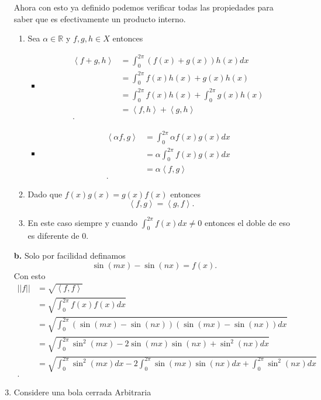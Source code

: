 \documentclass{report}
\begin{document}
\begin{enumerate}
    Ahora con esto ya definido podemos verificar todas las propiedades para saber que es efectivamente un producto interno.
    \begin{enumerate}
      \item Sea $\alpha \in \mathbb{R}$ y $f, g, h \in X$ entonces
	\begin{itemize}
	  \item 
	    \begin{align*}
	      \left<f + g, h \right> &= \int_0^{2\pi} \left( f\left( x \right) + g\left( x \right)  \right) h\left( x \right) dx \\
	      &= \int_0^{2\pi} f\left( x \right) h\left( x \right) + g\left( x \right) h\left( x \right)   \\
	      &= \int_0^{2\pi} f\left( x \right) h\left( x \right) + \int_0^{2\pi} g\left( x \right) h\left( x \right)  \\
	      &= \left<f, h \right> + \left<g, h \right> \\
	    .\end{align*}
	  \item 
	    \begin{align*}
	      \left<\alpha f, g \right> &= \int_0^{2\pi} \alpha f\left( x \right) g\left( x \right) dx\\
	      &= \alpha \int_0^{2\pi} f\left( x \right) g\left( x \right) dx \\
	      &= \alpha \left<f, g \right> \\
	    .\end{align*}
	\end{itemize}
      \item Dado que $f\left( x \right) g\left( x \right)  = g\left( x \right) f\left( x \right) $ entonces \[
	  \left<f, g \right> = \left<g, f \right>
      .\] 
    \item En este caso siempre y cuando $\int_0^{2\pi} f\left( x \right) dx \neq 0$ entonces el doble de eso es diferente de 0.
    \end{enumerate}
  \item[\textbf{b.}] Solo por facilidad definamos \[
      \sin\left( mx \right) - \sin\left( nx \right) = f\left( x \right)
  .\] Con esto
    \begin{align*}
      \left| \left| f \right|  \right| &= \sqrt{\left< f, f\right>}  \\
      &= \sqrt{\int_0^{2\pi} f\left( x \right) f\left( x \right) dx}  \\
      &= \sqrt{\int_0^{2\pi} \left( \sin\left( mx \right) - \sin\left( nx \right) \right) \left( \sin\left( mx \right) - \sin\left( nx \right)  \right) dx}  \\
      &= \sqrt{\int_0^{2\pi} \sin^2\left( mx \right) - 2\sin\left( mx \right) \sin\left( nx \right) + \sin^2\left( nx \right) dx}  \\
      &= \sqrt{\int_0^{2\pi} \sin^2\left( mx \right)dx - 2\int_0^{2\pi} \sin\left( mx \right) \sin\left( nx \right)dx + \int_0^{2\pi} \sin^2\left( nx \right)dx }  \\
    .\end{align*}
  \item Considere una bola cerrada Arbitraria 
\end{enumerate}
\end{document}
